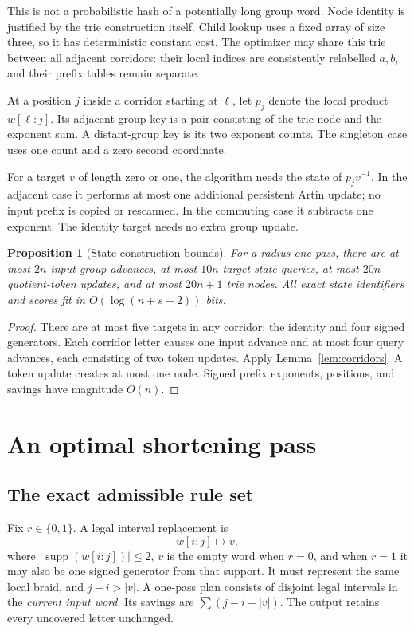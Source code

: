 \documentclass[11pt]{article}
\newtheorem{proposition}[theorem]{Proposition}
\theoremstyle{definition}
\theoremstyle{remark}
\newcommand{\supp}{\operatorname{supp}}
\begin{document}
This is not a probabilistic hash of a potentially long group word. Node
identity is justified by the trie construction itself. Child lookup uses a
fixed array of size three, so it has deterministic constant cost. The
optimizer may share this trie between all adjacent corridors: their local
indices are consistently relabelled $a,b$, and their prefix tables remain
separate.

At a position $j$ inside a corridor starting at $\ell$, let $p_j$ denote the
local product $w[\ell:j]$. Its adjacent-group key is a pair consisting of the
trie node and the exponent sum. A distant-group key is its two exponent
counts. The singleton case uses one count and a zero second coordinate.

For a target $v$ of length zero or one, the algorithm needs the state of
$p_jv^{-1}$. In the adjacent case it performs at most one additional
persistent Artin update; no input prefix is copied or rescanned. In the
commuting case it subtracts one exponent. The identity target needs no
extra group update.

\begin{proposition}[State construction bounds]\label{prop:states}
For a radius-one pass, there are at most $2n$ input group advances, at most
$10n$ target-state queries, at most $20n$ quotient-token updates, and at most
$20n+1$ trie nodes. All exact state identifiers and scores fit in
$O(\log(n+s+2))$ bits.
\end{proposition}
\begin{proof}
There are at most five targets in any corridor: the identity and four signed
generators. Each corridor letter causes one input advance and at most four
query advances, each consisting of two token updates. Apply
Lemma~\ref{lem:corridors}. A token update creates at most one node. Signed
prefix exponents, positions, and savings have magnitude $O(n)$.
\end{proof}

\section{An optimal shortening pass}
\subsection{The exact admissible rule set}
Fix $r\in\{0,1\}$. A legal interval replacement is
\[
 w[i:j]\longmapsto v,
\]
where $|\supp(w[i:j])|\le2$, $v$ is the empty word when $r=0$, and when $r=1$
it may also be one signed generator from that support. It must represent the
same local braid, and $j-i>|v|$. A one-pass plan consists of disjoint legal
intervals in the \emph{current input word}. Its savings are
$\sum(j-i-|v|)$. The output retains every uncovered letter unchanged.
\end{document}
